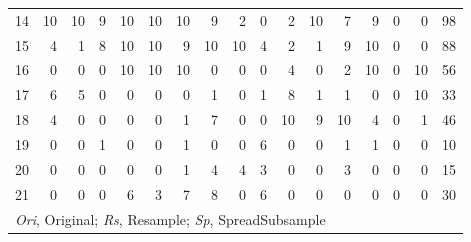 \documentclass{elsart}
\begin{document}
\begin{table}[t]
\begin{center}
\begin{scriptsize}
\begin{tabular}{r|rrr|rrr|rrr|rrr|rrr|r}
  14 &  10 &   10 &  9 &  10 &   10 &  10 &   9 &   2 &   0 &   2 &  10 &   7 &   9 &   0 &   0 & 98 \\
  15 &   4 &    1 &  8 &  10 &   10 &   9 &  10 &  10 &   4 &   2 &   1 &   9 &  10 &   0 &   0 & 88\\
  16 &   0 &    0 &  0 &  10 &   10 &  10 &   0 &   0 &   0 &   4 &   0 &   2 &  10 &   0 &  10 & 56\\
  17 &   6 &    5 &  0 &   0 &    0 &   0 &   1 &   0 &   1 &   8 &   1 &   1 &   0 &   0 &  10 & 33\\
  18 &   4 &    0 &  0 &   0 &    0 &   1 &   7 &   0 &   0 &  10 &   9 &  10 &   4 &   0 &   1 & 46\\
  19 &   0 &    0 &  1 &   0 &    0 &   1 &   0 &   0 &   6 &   0 &   0 &   1 &   1 &   0 &   0 & 10\\
  20 &   0 &    0 &  0 &   0 &    0 &   1 &   4 &   4 &   3 &   0 &   0 &   3 &   0 &   0 &   0 & 15\\
  21 &   0 &    0 &  0 &   6 &    3 &   7 &   8 &   0 &   6 &   0 &   0 &   0 &   0 &   0 &   0 & 30\\
\hline
\multicolumn{17}{l}{\scriptsize \emph{Ori}, Original; \emph{Rs}, Resample; \emph{Sp}, SpreadSubsample}\\
\end{tabular}
\end{scriptsize}
\end{center}
\end{table}
\end{document}
